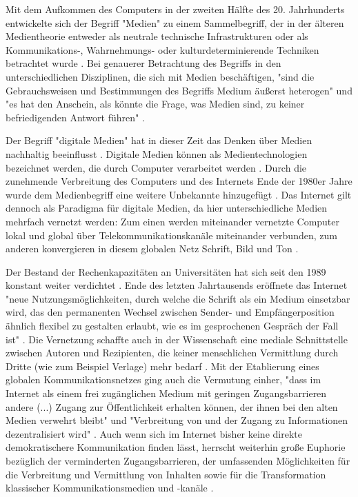 Mit dem Aufkommen des Computers in der zweiten Hälfte des 20. Jahrhunderts entwickelte sich der Begriff "Medien" zu einem Sammelbegriff, der in der älteren Medientheorie entweder als neutrale technische Infrastrukturen oder als Kommunikations-, Wahrnehmungs- oder kulturdeterminierende Techniken betrachtet wurde \cite[:12]{Beck_2005}. Bei genauerer Betrachtung des Begriffs in den unterschiedlichen Disziplinen, die sich mit Medien beschäftigen, "sind die Gebrauchsweisen und Bestimmungen des Begriffs Medium äußerst heterogen" und "es hat den Anschein, als könnte die Frage, was Medien sind, zu keiner befriedigenden Antwort führen" \cite[:33]{Burkhardt_2015}.

Der Begriff "digitale Medien" hat in dieser Zeit das Denken über Medien nachhaltig beeinflusst  \cite[:30]{Burkhardt_2015}. Digitale Medien können als Medientechnologien bezeichnet werden, die durch Computer verarbeitet werden \cite{Nuenning_2010}. Durch die zunehmende Verbreitung des Computers und des Internets Ende der 1980er Jahre wurde dem Medienbegriff eine weitere Unbekannte hinzugefügt \cite{Burkhardt_2015}. Das Internet gilt dennoch als Paradigma für digitale Medien, da hier unterschiedliche Medien mehrfach vernetzt werden: Zum einen werden miteinander vernetzte Computer lokal und global über Telekommunikationskanäle miteinander verbunden, zum anderen konvergieren in diesem globalen Netz Schrift, Bild und Ton \cite{Nuenning_2010}.

Der Bestand der Rechenkapazitäten an Universitäten hat sich seit den 1989 konstant weiter verdichtet \cite{Rutenfranz_1997}. Ende des letzten Jahrtausends eröffnete das Internet "neue Nutzungsmöglichkeiten, durch welche die Schrift als ein Medium einsetzbar wird, das den permanenten Wechsel zwischen Sender- und Empfängerposition ähnlich flexibel zu gestalten erlaubt, wie es im gesprochenen Gespräch der Fall ist" \cite{Sandbothe_2000}. Die Vernetzung schaffte auch in der Wissenschaft eine mediale Schnittstelle zwischen Autoren und Rezipienten, die keiner menschlichen Vermittlung durch Dritte (wie zum Beispiel Verlage) mehr bedarf \cite{Naeder_2010}. Mit der Etablierung eines globalen Kommunikationsnetzes ging auch die Vermutung einher, "dass im Internet als einem frei zugänglichen Medium mit geringen Zugangsbarrieren andere (...) Zugang zur Öffentlichkeit erhalten können, der ihnen bei den alten Medien verwehrt bleibt" und "Verbreitung von und der Zugang zu Informationen dezentralisiert wird" \cite{Gerhards_2007}. Auch wenn sich im Internet bisher keine direkte demokratischere Kommunikation finden lässt, herrscht weiterhin große Euphorie bezüglich der verminderten Zugangsbarrieren, der umfassenden Möglichkeiten für die Verbreitung und Vermittlung von Inhalten sowie für die Transformation klassischer Kommunikationsmedien und -kanäle  \cite{Gerhards_2007}.

